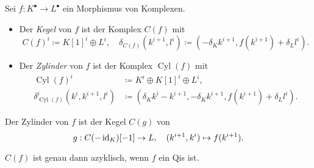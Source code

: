 \documentclass{cheat-sheet}
\newenvironment{centertikzcd}
  {\begin{center}\begin{tikzcd}}
  {\end{tikzcd}\end{center}}
\newcommand{\CCC}[1]{{#1}^{\bullet}} %
\DeclareMathOperator{\Cyl}{Cyl} %
\begin{document}
\begin{defn}
  Sei $f : \CCC{K} \to \CCC{L}$ ein Morphismus von Komplexen.
  \begin{itemize}
    \item Der \emph{Kegel} von $f$ ist der Komplex $C(f)$ mit
    \[
      C(f)^i \coloneqq K[1]^i \oplus L^i, \quad
      \delta_{C(f)}(k^{i+1}, l^i) \coloneqq (- \delta_K k^{i+1}, f(k^{i+1}) + \delta_L l^i).
    \]
    \item Der \emph{Zylinder} von $f$ ist der Komplex $\Cyl(f)$ mit
    \begin{align*}
      \Cyl(f)^i & \coloneqq K^i \oplus K[1]^i \oplus L^i, \\
      \delta_{\Cyl(f)}^i (k^i, k^{i+1}, l^i) & \coloneqq (\delta_K k^i - k^{i+1}, - \delta_K k^{i+1}, f(k^{i+1}) + \delta_L l^i).
    \end{align*}
  \end{itemize}
\end{defn}

\begin{bem}
  Der Zylinder von $f$ ist der Kegel $C(g)$ von
  \[ g : C(-\operatorname{id}_K)[-1] \to L, \quad (k^{i+1}, k^i) \mapsto f(k^{i+1}). \]
\end{bem}


\begin{kor}
  $C(f)$ ist genau dann azyklisch, wenn $f$ ein Qis ist.
\end{kor}
\end{document}
